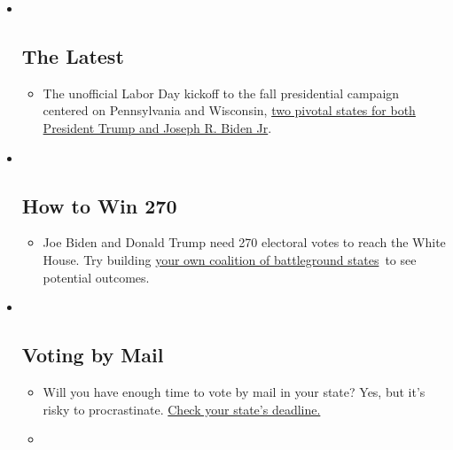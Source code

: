 \begin{itemize}
\item ~
  \hypertarget{the-latest}{%
  \subsection{The Latest}\label{the-latest}}

  \begin{itemize}
  \item
    The unofficial Labor Day kickoff to the fall presidential campaign
    centered on Pennsylvania and Wisconsin,
    \href{https://www.nytimes3xbfgragh.onion/2020/09/07/us/politics/wisconsin-biden-harris-trump-pence.html?action=click\&pgtype=Article\&state=default\&region=BELOW_MAIN_CONTENT\&context=storylines_guide}{two
    pivotal states for both President Trump and Joseph R. Biden Jr}.
  \end{itemize}
\item ~
  \hypertarget{how-to-win-270}{%
  \subsection{How to Win 270}\label{how-to-win-270}}

  \begin{itemize}
  \item
    Joe Biden and Donald Trump need 270 electoral votes to reach the
    White House. Try building
    \href{https://www.nytimes3xbfgragh.onion/interactive/2020/us/elections/election-states-biden-trump.html?action=click\&pgtype=Article\&state=default\&region=BELOW_MAIN_CONTENT\&context=storylines_guide}{your
    own coalition of battleground states}~to see potential outcomes.
  \end{itemize}
\item ~
  \hypertarget{voting-by-mail}{%
  \subsection{Voting by Mail}\label{voting-by-mail}}

  \begin{itemize}
  \item
    Will you have enough time to vote by mail in your state? Yes, but
    it's risky to procrastinate.
    \href{https://www.nytimes3xbfgragh.onion/interactive/2020/08/31/us/politics/vote-by-mail-deadlines.html?action=click\&pgtype=Article\&state=default\&region=BELOW_MAIN_CONTENT\&context=storylines_guide}{Check
    your state's deadline.}
  \item
    \href{https://www.nytimes3xbfgragh.onion/interactive/2020/us/elections/joe-biden.html?action=click\&pgtype=Article\&state=default\&region=BELOW_MAIN_CONTENT\&context=storylines_guide}{}


\end{itemize}
\end{itemize}
